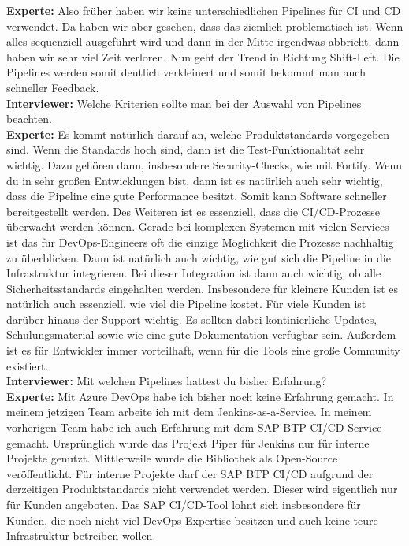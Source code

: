 \begin{linenumbers}
    \textbf{Experte:} Also früher haben wir keine unterschiedlichen Pipelines für CI und CD verwendet. Da haben wir aber gesehen, dass das ziemlich problematisch ist. Wenn alles sequenziell ausgeführt wird und dann in der Mitte irgendwas abbricht, dann haben wir sehr viel Zeit verloren. Nun geht der Trend in Richtung Shift-Left. Die Pipelines werden somit deutlich verkleinert und somit bekommt man auch schneller Feedback.\\
    \textbf{Interviewer:} Welche Kriterien sollte man bei der Auswahl von Pipelines beachten.\\
    \textbf{Experte:} Es kommt natürlich darauf an, welche Produktstandards vorgegeben sind. Wenn die Standards hoch sind, dann ist die Test-Funktionalität sehr wichtig. Dazu gehören dann, insbesondere Security-Checks, wie mit Fortify. Wenn du in sehr großen Entwicklungen bist, dann ist es natürlich auch sehr wichtig, dass die Pipeline eine gute Performance besitzt. Somit kann Software schneller bereitgestellt werden. Des Weiteren ist es essenziell, dass die CI/CD-Prozesse überwacht werden können. Gerade bei komplexen Systemen mit vielen Services ist das für DevOps-Engineers oft die einzige Möglichkeit die Prozesse nachhaltig zu überblicken. Dann ist natürlich auch wichtig, wie gut sich die Pipeline in die Infrastruktur integrieren. Bei dieser Integration ist dann auch wichtig, ob alle Sicherheitsstandards eingehalten werden. Insbesondere für kleinere Kunden ist es natürlich auch essenziell, wie viel die Pipeline kostet. Für viele Kunden ist darüber hinaus der Support wichtig. Es sollten dabei kontinierliche Updates, Schulungsmaterial sowie wie eine gute Dokumentation verfügbar sein. Außerdem ist es für Entwickler immer vorteilhaft, wenn für die Tools eine große Community existiert.\\
    \textbf{Interviewer:} Mit welchen Pipelines hattest du bisher Erfahrung?\\
    \textbf{Experte:} Mit Azure DevOps habe ich bisher noch keine Erfahrung gemacht. In meinem jetzigen Team arbeite ich mit dem Jenkins-as-a-Service. In meinem vorherigen Team habe ich auch Erfahrung mit dem SAP BTP CI/CD-Service gemacht. Ursprünglich wurde das Projekt Piper für Jenkins nur für interne Projekte genutzt. Mittlerweile wurde die Bibliothek als Open-Source veröffentlicht. Für interne Projekte darf der SAP BTP CI/CD aufgrund der derzeitigen Produktstandards nicht verwendet werden. Dieser wird eigentlich nur für Kunden angeboten. Das SAP CI/CD-Tool lohnt sich insbesondere für Kunden, die noch nicht viel DevOps-Expertise besitzen und auch keine teure Infrastruktur betreiben wollen.\\

\end{linenumbers}
